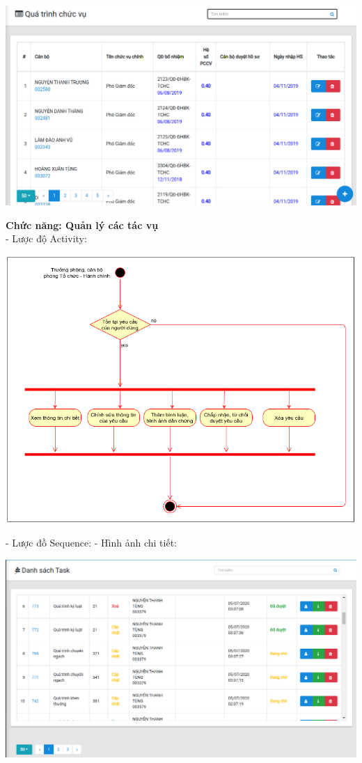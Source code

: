\begin{center}
  \captionsetup{type=figure}
  \includegraphics[scale=0.5]{img/Screen/qlquatrinh.png}
\end{center}
\textbf{Chức năng: Quản lý các tác vụ}\\
- Lược độ Activity:
\begin{center}
  \captionsetup{type=figure}
  \includegraphics[scale=0.5]{img/UML/TchcStaff/activityQLTask.png}
\end{center}
- Lược đồ Sequence:
- Hình ảnh chi tiết: 
\begin{center}
  \captionsetup{type=figure}
  \includegraphics[scale=0.5]{img/Screen/qltask.png}
\end{center}

